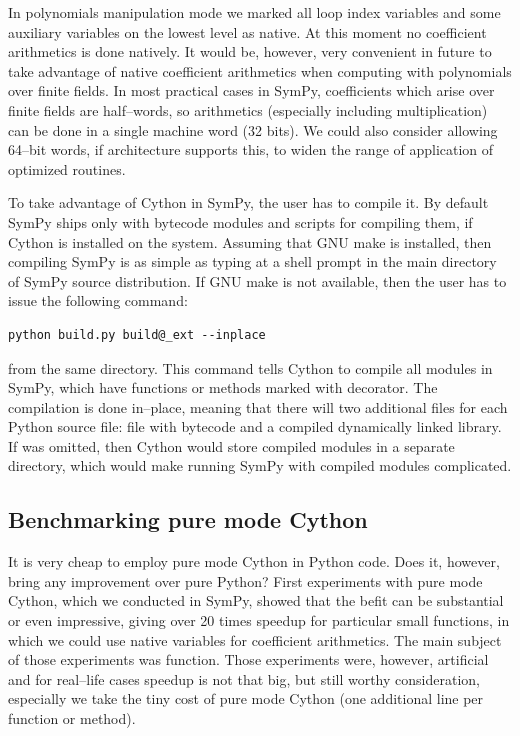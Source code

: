 In polynomials manipulation mode we marked all loop index variables and some auxiliary variables on
the lowest level as native. At this moment no coefficient arithmetics is done natively. It would be,
however, very convenient in future to take advantage of native coefficient arithmetics when computing
with polynomials over finite fields. In most practical cases in SymPy, coefficients which arise over
finite fields are half--words, so arithmetics (especially including multiplication) can be done in a
single machine word (32 bits). We could also consider allowing 64--bit words, if architecture supports
this, to widen the range of application of optimized routines.

To take advantage of Cython in SymPy, the user has to compile it. By default SymPy ships only with
bytecode modules and scripts for compiling them, if Cython is installed on the system. Assuming
that GNU make is installed, then compiling SymPy is as simple as typing  at a shell prompt
in the main directory of SymPy source distribution. If GNU make is not available, then the user
has to issue the following command:

\begin{Verbatim}[commandchars=@\[\]]
python build.py build@_ext --inplace
\end{Verbatim}
\noindent
from the same directory. This command tells Cython to compile all modules in SymPy, which have
functions or methods marked with  decorator. The compilation is done in--place,
meaning that there will two additional files for each Python source file:  file with
bytecode and a compiled dynamically linked library. If  was omitted, then Cython
would store compiled modules in a separate directory, which would make running SymPy with
compiled modules complicated.


\subsection{Benchmarking pure mode Cython}

It is very cheap to employ pure mode Cython in Python code. Does it, however, bring any improvement
over pure Python? First experiments with pure mode Cython, which we conducted in SymPy, showed that
the befit can be substantial or even impressive, giving over 20 times speedup for particular small
functions, in which we could use native variables for coefficient arithmetics. The main subject of
those experiments was  function. Those experiments were, however, artificial and
for real--life cases speedup is not that big, but still worthy consideration, especially we take
the tiny cost of pure mode Cython (one additional line per function or method).

